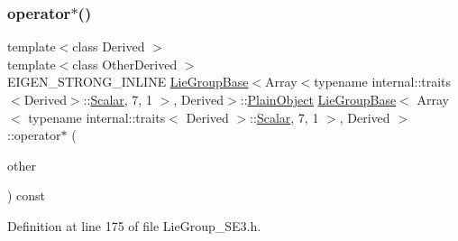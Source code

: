 \subsubsection{\texorpdfstring{operator$\ast$()}{operator*()}\hspace{0.1cm}{\footnotesize\ttfamily [3/4]}}
{\footnotesize\ttfamily template$<$class Derived $>$ \\
template$<$class Other\+Derived $>$ \\
E\+I\+G\+E\+N\+\_\+\+S\+T\+R\+O\+N\+G\+\_\+\+I\+N\+L\+I\+NE \hyperlink{class_lie_group_base}{Lie\+Group\+Base}$<$Array$<$typename internal\+::traits$<$Derived$>$\+::\hyperlink{class_lie_group_base_3_01_array_3_01typename_01internal_1_1traits_3_01_derived_01_4_1_1_scalar_0d6d4b5459662fc32c7117aee50362fb1_a831695c575380c9a1df32eff9fc4a8c6}{Scalar}, 7, 1 $>$, Derived$>$\+::\hyperlink{class_lie_group_base_3_01_array_3_01typename_01internal_1_1traits_3_01_derived_01_4_1_1_scalar_0d6d4b5459662fc32c7117aee50362fb1_a950a48c9e027bcd00193aa20a59ee723}{Plain\+Object} \hyperlink{class_lie_group_base}{Lie\+Group\+Base}$<$ Array$<$ typename internal\+::traits$<$ Derived $>$\+::\hyperlink{class_lie_group_base_3_01_array_3_01typename_01internal_1_1traits_3_01_derived_01_4_1_1_scalar_0d6d4b5459662fc32c7117aee50362fb1_a831695c575380c9a1df32eff9fc4a8c6}{Scalar}, 7, 1 $>$, Derived $>$\+::operator$\ast$ (\begin{DoxyParamCaption}\item[{const \hyperlink{class_lie_group_base}{Lie\+Group\+Base}$<$ Array$<$ \hyperlink{class_lie_group_base_3_01_array_3_01typename_01internal_1_1traits_3_01_derived_01_4_1_1_scalar_0d6d4b5459662fc32c7117aee50362fb1_a831695c575380c9a1df32eff9fc4a8c6}{Scalar}, 7, 1 $>$, Other\+Derived $>$ \&}]{other }\end{DoxyParamCaption}) const}



Definition at line 175 of file Lie\+Group\+\_\+\+S\+E3.\+h.

\hypertarget{class_lie_group_base_3_01_array_3_01typename_01internal_1_1traits_3_01_derived_01_4_1_1_scalar_0d6d4b5459662fc32c7117aee50362fb1_a6b584aab5eef636bbf91bbfcaf03af5c}{}\label{class_lie_group_base_3_01_array_3_01typename_01internal_1_1traits_3_01_derived_01_4_1_1_scalar_0d6d4b5459662fc32c7117aee50362fb1_a6b584aab5eef636bbf91bbfcaf03af5c} 
